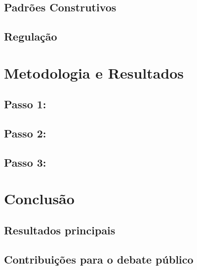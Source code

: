 \section{Padrões Construtivos}
\section{Regulação}

\chapter{Metodologia e Resultados}
\label{chp:analise}

\section{Passo 1: }
\label{sec:perg1}

\section{Passo 2: }
\label{sec:perg2}

\section{Passo 3: }
\label{sec:perg3}

\chapter{Conclusão}
\label{chp:conclusao}

\section{Resultados principais}
\label{sec:conclusao}

\section{Contribuições para o debate público}
\label{sec:contribuicoes}

